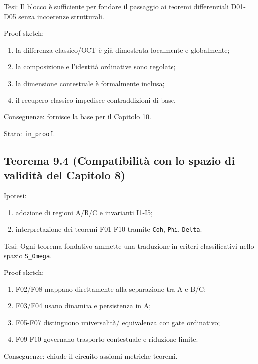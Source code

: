 Tesi:
Il blocco è sufficiente per fondare il passaggio ai teoremi differenziali D01-D05 senza incoerenze strutturali.

Proof sketch:

\begin{enumerate}
\def\labelenumi{\arabic{enumi}.}
\tightlist
\item
  la differenza classico/OCT è già dimostrata localmente e globalmente;
\item
  la composizione e l'identità ordinative sono regolate;
\item
  la dimensione contestuale è formalmente inclusa;
\item
  il recupero classico impedisce contraddizioni di base.
\end{enumerate}

Conseguenze:
fornisce la base per il Capitolo 10.

Stato: \texttt{in\_proof}.

\subsection{Teorema 9.4 (Compatibilità con lo spazio di validità del Capitolo 8)}

Ipotesi:

\begin{enumerate}
\def\labelenumi{\arabic{enumi}.}
\tightlist
\item
  adozione di regioni A/B/C e invarianti I1-I5;
\item
  interpretazione dei teoremi F01-F10 tramite \texttt{Coh}, \texttt{Phi}, \texttt{Delta}.
\end{enumerate}

Tesi:
Ogni teorema fondativo ammette una traduzione in criteri classificativi nello spazio \texttt{S\_Omega}.

Proof sketch:

\begin{enumerate}
\def\labelenumi{\arabic{enumi}.}
\tightlist
\item
  F02/F08 mappano direttamente alla separazione tra A e B/C;
\item
  F03/F04 usano dinamica e persistenza in A;
\item
  F05-F07 distinguono universalità/ equivalenza con gate ordinativo;
\item
  F09-F10 governano trasporto contestuale e riduzione limite.
\end{enumerate}

Conseguenze:
chiude il circuito assiomi-metriche-teoremi.

